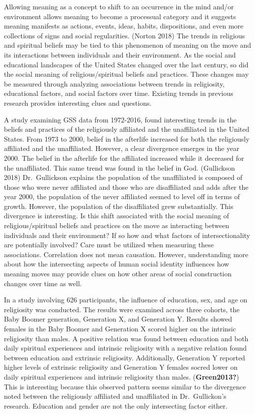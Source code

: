 \documentclass[
  12pt,
  letterpaper,
]{article}
\begin{document}
Allowing meaning as a concept to shift to an occurrence in the mind
and/or environment allows meaning to become a processual category and it
suggests meaning manifests as actions, events, ideas, habits,
dispositions, and even more collections of signs and social
regularities. (Norton 2018) The trends in religious and spiritual
beliefs may be tied to this phenomenon of meaning on the move and its
interactions between individuals and their environment. As the social
and educational landscapes of the United States changed over the last
century, so did the social meaning of religious/spiritual beliefs and
practices. These changes may be measured through analyzing associations
between trends in religiosity, educational factors, and social factors
over time. Existing trends in previous research provides interesting
clues and questions.

A study examining GSS data from 1972-2016, found interesting trends in
the beliefs and practices of the religiously affiliated and the
unaffiliated in the United States. From 1973 to 2000, belief in the
afterlife increased for both the religiously affiliated and the
unaffiliated. However, a clear divergence emerges in the year 2000. The
belief in the afterlife for the affiliated increased while it decreased
for the unaffiliated. This same trend was found in the belief in God.
(Gullickson 2018) Dr.~Gullickson explains the population of the
unaffiliated is composed of those who were never affiliated and those
who are disaffiliated and adds after the year 2000, the population of
the never affiliated seemed to level off in terms of growth. However,
the population of the disaffiliated grew substantially. This divergence
is interesting. Is this shift associated with the social meaning of
religious/spiritual beliefs and practices on the move as interacting
between individuals and their environment? If so how and what factors of
intersectionality are potentially involved? Care must be utilized when
measuring these associations. Correlation does not mean causation.
However, understanding more about how the intersecting aspects of human
social identity influences how meaning moves may provide clues on how
other areas of social construction changes over time as well.

In a study involving 626 participants, the influence of education, sex,
and age on religiosity was conducted. The results were examined across
three cohorts, the Baby Boomer generation, Generation X, and Generation
Y. Results showed females in the Baby Boomer and Generation X scored
higher on the intrinsic religiosity than males. A positive relation was
found between education and both daily spiritual experiences and
intrinsic religiosity with a negative relation found between education
and extrinsic religiosity. Additionally, Generation Y reported higher
levels of extrinsic religiosity and Generation Y females socred lower on
daily spiritual experiences and intrinsic religiosity than males.
(\textbf{Green2013?}) This is interesting because this observed pattern
seems similar to the divergence noted between the religiously affiliated
and unaffiliated in Dr.~Gullickon's research. Education and gender are
not the only intersecting factor either.
\end{document}
